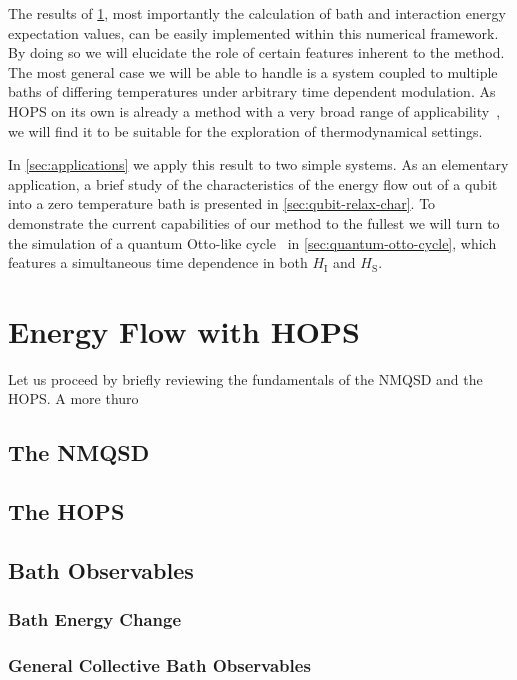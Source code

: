 \documentclass[reprint,aps,superscriptaddress]{revtex4-2}
\def\sys{\ensuremath{\mathrm{S}}}
\def\inter{\ensuremath{\mathrm{I}}}
\begin{document}
The results of \cref{sec:flow}, most importantly the calculation of
bath and interaction energy expectation values, can be easily
implemented within this numerical framework. By doing so we will
elucidate the role of certain features inherent to the method. The
most general case we will be able to handle is a system coupled to
multiple baths of differing temperatures under arbitrary time
dependent modulation. As HOPS on its own is already a method with a
very broad range of applicability~\cite{RichardDiss}, we will find it
to be suitable for the exploration of thermodynamical settings.

In \cref{sec:applications} we apply this result to two simple systems.
As an elementary application, a brief study of the characteristics of
the energy flow out of a qubit into a zero temperature bath is
presented in \cref{sec:qubit-relax-char}. To demonstrate the current
capabilities of our method to the fullest we will turn to the
simulation of a quantum Otto-like
cycle~\cite{cite:Geva1992Feb,cite:Wiedmann2020Mar,cite:Wiedmann2021Jun}
in \cref{sec:quantum-otto-cycle}, which features a simultaneous time
dependence in both \(H_{\inter}\) and \(H_{\sys}\).

\section{Energy Flow with HOPS}
\label{sec:flow}

Let us proceed by briefly reviewing the fundamentals of the NMQSD and
the HOPS. A more thuro
\subsection{The NMQSD}
\label{sec:nmqsd}

\subsection{The HOPS}
\label{sec:hops}

\subsection{Bath Observables}
\label{sec:bath-observables}

\subsubsection{Bath Energy Change}
\label{sec:bath-energy-change}

\subsubsection{General Collective Bath Observables}
\label{sec:gener-coll-bath}
\end{document}
